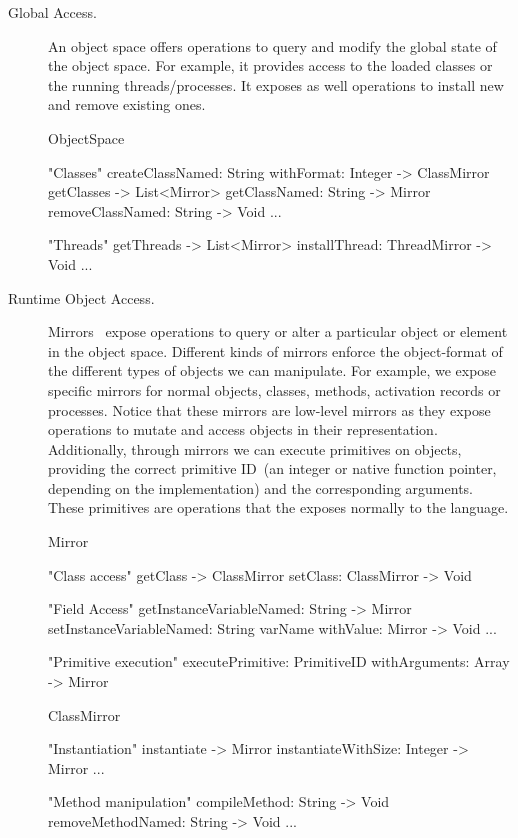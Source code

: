 \begin{description}
\item[Global Access.] An object space offers operations to query and modify the global state of the object space. For example, it provides access to the loaded classes or the running threads/processes. It exposes as well operations to install new and remove existing ones.

\begin{code}
ObjectSpace {
    "Classes"
    createClassNamed: String withFormat: Integer -> ClassMirror
    getClasses -> List<Mirror>
    getClassNamed: String -> Mirror
    removeClassNamed: String -> Void
    ...

    "Threads"
    getThreads -> List<Mirror>
    installThread: ThreadMirror -> Void
    ...
}
\end{code}

\item[Runtime Object Access.] Mirrors~\cite{Brac04b} expose operations to query or alter a particular object or element in the object space. Different kinds of mirrors enforce the object-format of the different types of objects we can manipulate. For example, we expose specific mirrors for normal objects, classes, methods, activation records or processes. Notice that these mirrors are low-level mirrors as they expose operations to mutate and access objects in their \VM representation. Additionally, through mirrors we can execute \VM primitives on objects, providing the correct primitive ID~(an integer or native function pointer, depending on the implementation) and the corresponding arguments. These primitives are operations that the \VM exposes normally to the language.

\begin{code}
Mirror {
    "Class access"
    getClass -> ClassMirror
    setClass: ClassMirror -> Void

    "Field Access"
    getInstanceVariableNamed: String -> Mirror
    setInstanceVariableNamed: String varName withValue: Mirror -> Void
    ...
    
    "Primitive execution"
    executePrimitive: PrimitiveID withArguments: Array -> Mirror
}
\end{code}

\begin{code}
ClassMirror {
    "Instantiation"
    instantiate -> Mirror
    instantiateWithSize: Integer -> Mirror
    ...

    "Method manipulation"    
    compileMethod: String -> Void
    removeMethodNamed: String -> Void
    ...
}
\end{code}

\end{description}

